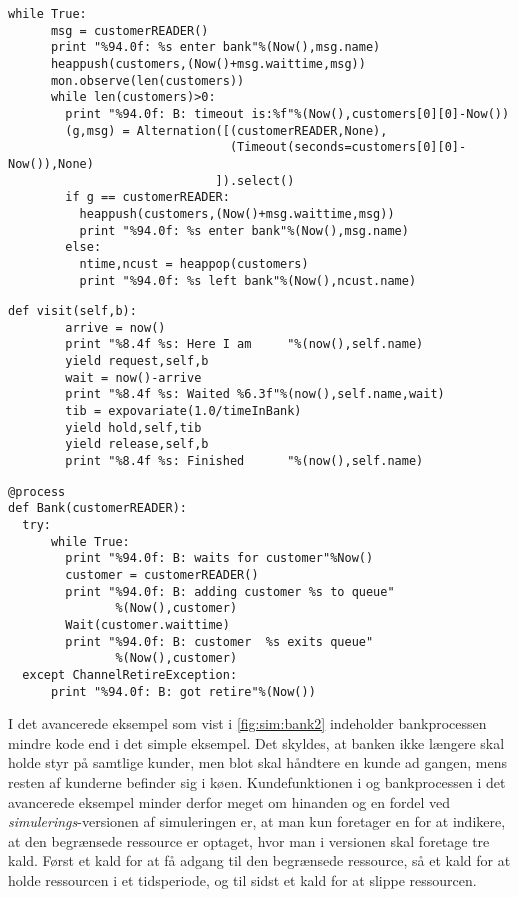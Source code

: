 \begin{lstlisting}[firstnumber=39,float=hbtp, label=fig:sim:bank, caption= Uddrag af bank processen i simulation]
    while True:
      msg = customerREADER()
      print "%94.0f: %s enter bank"%(Now(),msg.name)
      heappush(customers,(Now()+msg.waittime,msg))
      mon.observe(len(customers))
      while len(customers)>0:
        print "%94.0f: B: timeout is:%f"%(Now(),customers[0][0]-Now())
        (g,msg) = Alternation([(customerREADER,None),
                               (Timeout(seconds=customers[0][0]- Now()),None)
                             ]).select()
        if g == customerREADER:
          heappush(customers,(Now()+msg.waittime,msg))
          print "%94.0f: %s enter bank"%(Now(),msg.name)
        else:
          ntime,ncust = heappop(customers)
          print "%94.0f: %s left bank"%(Now(),ncust.name) 
\end{lstlisting}
\begin{lstlisting}[firstnumber=20 ,float=hbtp, label=fig:simpy:customer, caption=Funktionen \code{visit} i \simpy]
     def visit(self,b):                                
        arrive = now()
        print "%8.4f %s: Here I am     "%(now(),self.name)
        yield request,self,b                          
        wait = now()-arrive
        print "%8.4f %s: Waited %6.3f"%(now(),self.name,wait)
        tib = expovariate(1.0/timeInBank)            
        yield hold,self,tib                          
        yield release,self,b                         
        print "%8.4f %s: Finished      "%(now(),self.name)
\end{lstlisting}
\begin{lstlisting}[firstnumber=33 ,float=hbtp, label=fig:sim:bank2, caption=Bankprocessen\, hvor banken er en begrænset ressource. ]
  @process
def Bank(customerREADER):
  try:
      while True:
        print "%94.0f: B: waits for customer"%Now()
        customer = customerREADER()
        print "%94.0f: B: adding customer %s to queue"
               %(Now(),customer)
        Wait(customer.waittime)
        print "%94.0f: B: customer  %s exits queue"
               %(Now(),customer)
  except ChannelRetireException:
      print "%94.0f: B: got retire"%(Now())

\end{lstlisting}
I det avancerede eksempel som vist i  \cref{fig:sim:bank2} indeholder bankprocessen mindre kode end i det simple eksempel. Det skyldes, at banken ikke længere skal holde styr på samtlige kunder, men blot skal håndtere en kunde ad gangen, mens resten af kunderne befinder sig i køen. Kundefunktionen i \simpy og bankprocessen i det avancerede eksempel minder derfor meget om hinanden og en fordel ved \emph{simulerings}-versionen af simuleringen er, at man kun foretager en  for at indikere, at den begrænsede ressource er optaget, hvor man i \simpy versionen skal foretage tre kald. Først et kald for at få adgang til den begrænsede ressource, så et kald for at holde ressourcen i et tidsperiode, og til sidst et kald for at slippe ressourcen.
